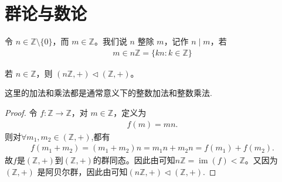 \documentclass[../../main.tex]{subfiles}
\begin{document}
\section{群论与数论}

\begin{definition}[整除]
令 $n\in \mathbb{Z}\setminus\{0\}$，而 $m\in \mathbb{Z}$。我们说 $n$ 整除 $m$，记作 $n\mid m$，若
\begin{align*}
m\in n\mathbb{Z}=\{kn:k\in\mathbb{Z}\}
\end{align*} 
\end{definition}

\begin{proposition}\label{proposition:nZ是Z的正规子群}
若 $n\in\mathbb{Z}$，则 $(n\mathbb{Z},+)\lhd(\mathbb{Z},+)$。
\end{proposition}
\begin{remark}
这里的加法和乘法都是通常意义下的整数加法和整数乘法.
\end{remark}
\begin{proof}
令 $f:\mathbb{Z}\to \mathbb{Z}$，对 $m\in\mathbb{Z}$，定义为
\begin{align*}
f(m)=mn.
\end{align*}
则对$\forall m_1,m_2\in (\mathbb{Z},+)$,都有 
\begin{align*}
f\left( m_1+m_2 \right) =\left( m_1+m_2 \right) n=m_1n+m_2n=f\left( m_1 \right) +f\left( m_2 \right) .
\end{align*}
故$f$是$(\mathbb{Z},+)$到$(\mathbb{Z},+)$的群同态。因此由可知$n\mathbb{Z}=\operatorname{im}(f)<\mathbb{Z}$。又因为 $(\mathbb{Z},+)$ 是阿贝尔群，因此由可知$(n\mathbb{Z},+)\lhd(\mathbb{Z},+)$.

\end{proof}
\end{document}
